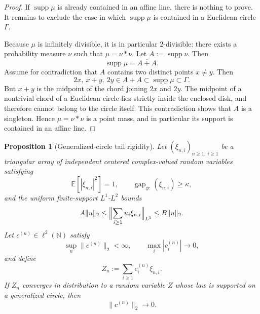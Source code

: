 \documentclass[11pt]{amsart}
\newtheorem{proposition}[theorem]{Proposition}
\newcommand{\E}{\mathbb{E}}
\newcommand{\N}{\mathbb{N}}
\newcommand{\supp}{\operatorname{supp}}
\newcommand{\gapgc}{\operatorname{gap}_{\mathrm{gc}}}
\begin{document}
\begin{proof}
If $\supp\mu$ is already contained in an affine line, there is nothing to
prove.  It remains to exclude the case in which $\supp\mu$ is contained in a
Euclidean circle $\Gamma$.

Because $\mu$ is infinitely divisible, it is in particular $2$-divisible:
there exists a probability measure $\nu$ such that $\mu=\nu*\nu$.  Let
$A:=\supp\nu$.  Then
\[
  \supp\mu = \overline{A+A}.
\]
Assume for contradiction that $A$ contains two distinct points $x\ne y$.  Then
\[
  2x,\ x+y,\ 2y \in A+A \subset \supp\mu \subset \Gamma.
\]
But $x+y$ is the midpoint of the chord joining $2x$ and $2y$.  The midpoint of a
nontrivial chord of a Euclidean circle lies strictly inside the enclosed disk,
and therefore cannot belong to the circle itself.  This contradiction shows
that $A$ is a singleton.  Hence $\mu=\nu*\nu$ is a point mass, and in
particular its support is contained in an affine line.
\end{proof}

\begin{proposition}[Generalized-circle tail rigidity]
\label{prop:tail-rigidity}
Let $(\xi_{n,i})_{n\ge 1,\ i\ge 1}$ be a triangular array of independent
centered complex-valued random variables satisfying
\[
  \E[|\xi_{n,i}|^2]=1,
  \qquad
  \gapgc(\xi_{n,i})\ge \kappa,
\]
and the uniform finite-support $L^1$-$L^2$ bounds
\[
  A\|u\|_2
  \le
  \Bigl\|\sum_{i\ge 1} u_i\xi_{n,i}\Bigr\|_{L^1}
  \le
  B\|u\|_2.
\]
Let $c^{(n)}\in\ell^2(\N)$ satisfy
\[
  \sup_n\|c^{(n)}\|_2<\infty,
  \qquad
  \max_i |c_i^{(n)}|\longrightarrow 0,
\]
and define
\[
  Z_n:=\sum_{i\ge 1} c_i^{(n)}\xi_{n,i}.
\]
If $Z_n$ converges in distribution to a random variable $Z$ whose law is
supported on a generalized circle, then
\[
  \|c^{(n)}\|_2\longrightarrow 0.
\]
\end{proposition}
\end{document}
